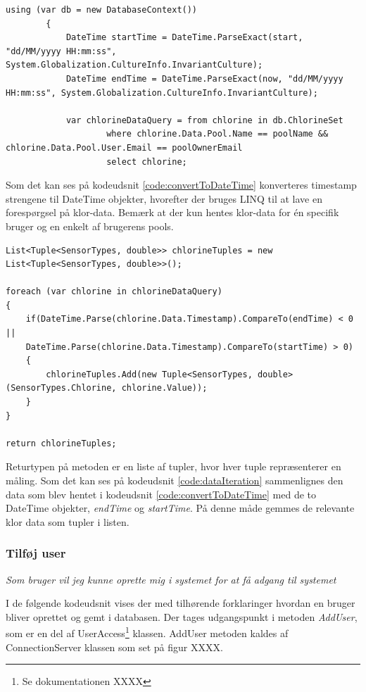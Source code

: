 \begin{lstlisting}[caption=Konvertering tilbage til DateTime objekter,label=code:convertToDateTime]
using (var db = new DatabaseContext())
		{   
			DateTime startTime = DateTime.ParseExact(start, "dd/MM/yyyy HH:mm:ss", System.Globalization.CultureInfo.InvariantCulture);
			DateTime endTime = DateTime.ParseExact(now, "dd/MM/yyyy HH:mm:ss", System.Globalization.CultureInfo.InvariantCulture);

			var chlorineDataQuery = from chlorine in db.ChlorineSet
					where chlorine.Data.Pool.Name == poolName && chlorine.Data.Pool.User.Email == poolOwnerEmail
					select chlorine;

\end{lstlisting}

Som det kan ses på kodeudsnit \ref{code:convertToDateTime} konverteres timestamp strengene til DateTime objekter, hvorefter der bruges LINQ til at lave en forespørgsel på klor-data. Bemærk at der kun hentes klor-data for én specifik bruger og en enkelt af brugerens pools.

\begin{lstlisting}[caption=Iteration over indhentet pool data,label=code:dataIteration]
List<Tuple<SensorTypes, double>> chlorineTuples = new List<Tuple<SensorTypes, double>>();

foreach (var chlorine in chlorineDataQuery)
{
	if(DateTime.Parse(chlorine.Data.Timestamp).CompareTo(endTime) < 0 ||
	DateTime.Parse(chlorine.Data.Timestamp).CompareTo(startTime) > 0)
	{
		chlorineTuples.Add(new Tuple<SensorTypes, double>(SensorTypes.Chlorine, chlorine.Value));
	}
}

return chlorineTuples;
\end{lstlisting}

Returtypen på metoden er en liste af tupler, hvor hver tuple repræsenterer en måling. Som det kan ses på kodeudsnit \ref{code:dataIteration} sammenlignes den data som blev hentet i kodeudsnit \ref{code:convertToDateTime} med de to DateTime objekter, \textit{endTime} og \textit{startTime}. På denne måde gemmes de relevante klor data som tupler i listen.

\subsubsection{Tilføj user}

\textit{Som bruger vil jeg kunne oprette mig i systemet for at få adgang til systemet}

I de følgende kodeudsnit vises der med tilhørende forklaringer hvordan en bruger bliver oprettet og gemt i databasen. Der tages udgangspunkt i metoden \textit{AddUser}, som er en del af UserAccess\footnote{Se dokumentationen XXXX} klassen. AddUser metoden kaldes af ConnectionServer klassen  som set på figur XXXX.
 
